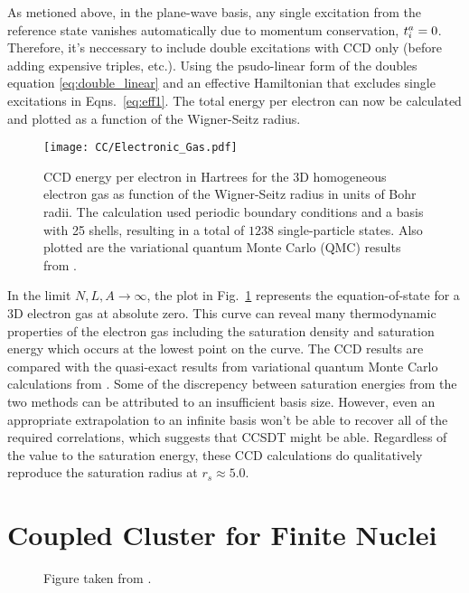 \documentclass[thesis.tex]{subfiles}
\begin{document}
As metioned above, in the plane-wave basis, any single excitation from the reference state vanishes automatically due to momentum conservation, $t^{a}_{i} = 0$.  Therefore, it's neccessary to include double excitations with CCD only (before adding expensive triples, etc.).  Using the psudo-linear form of the doubles equation \eqref{eq:double_linear} and an effective Hamiltonian that excludes single excitations in Eqns.\ \eqref{eq:eff1}.  The total energy per electron can now be calculated and plotted as a function of the Wigner-Seitz radius.
\begin{figure}[h]
  \texttt{[image: CC/Electronic\_Gas.pdf]}
  \caption{CCD energy per electron in Hartrees for the 3D homogeneous electron gas as function of the Wigner-Seitz radius in units of Bohr radii. The calculation used periodic boundary conditions and a basis with 25 shells, resulting in a total of $1238$ single-particle states. Also plotted are the variational quantum Monte Carlo (QMC) results from \cite{LOPEZ2006}.}  
  \label{fig:Electronic_Gas}
\end{figure}
In the limit $N,L,A \rightarrow \infty$, the plot in Fig.\ \ref{fig:Electronic_Gas} represents the equation-of-state for a 3D electron gas at absolute zero.  This curve can reveal many thermodynamic properties of the electron gas including the saturation density and saturation energy which occurs at the lowest point on the curve.  The CCD results are compared with the quasi-exact results from variational quantum Monte Carlo calculations from \cite{LOPEZ2006}.  Some of the discrepency between saturation energies from the two methods can be attributed to an insufficient basis size.  However, even an appropriate extrapolation to an infinite basis won't be able to recover all of the required correlations, which suggests that CCSDT might be able.  Regardless of the value to the saturation energy, these CCD calculations do qualitatively reproduce the saturation radius at $r_{s} \approx 5.0$.




\section{Coupled Cluster for Finite Nuclei} \label{section:cc_nuclei}

\begin{figure}[h]
  \centering
  \caption{Figure taken from \cite{MACHLEIDT2016}.}  
  \label{fig:Chiral_Forces}
\end{figure}
\end{document}
